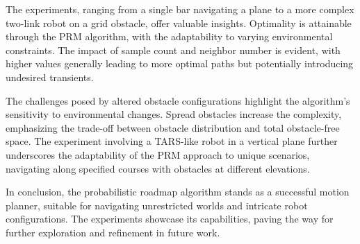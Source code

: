\documentclass{IEEEtaes}
\begin{document}
The experiments, ranging from a single bar navigating a plane to a more complex two-link robot on a grid obstacle, offer valuable insights. Optimality is attainable through the PRM algorithm, with the adaptability to varying environmental constraints. The impact of sample count and neighbor number is evident, with higher values generally leading to more optimal paths but potentially introducing undesired transients.

The challenges posed by altered obstacle configurations highlight the algorithm's sensitivity to environmental changes. Spread obstacles increase the complexity, emphasizing the trade-off between obstacle distribution and total obstacle-free space. The experiment involving a TARS-like robot in a vertical plane further underscores the adaptability of the PRM approach to unique scenarios, navigating along specified courses with obstacles at different elevations.

In conclusion, the probabilistic roadmap algorithm stands as a successful motion planner, suitable for navigating unrestricted worlds and intricate robot configurations. The experiments showcase its capabilities, paving the way for further exploration and refinement in future work.



\ %
\end{document}
